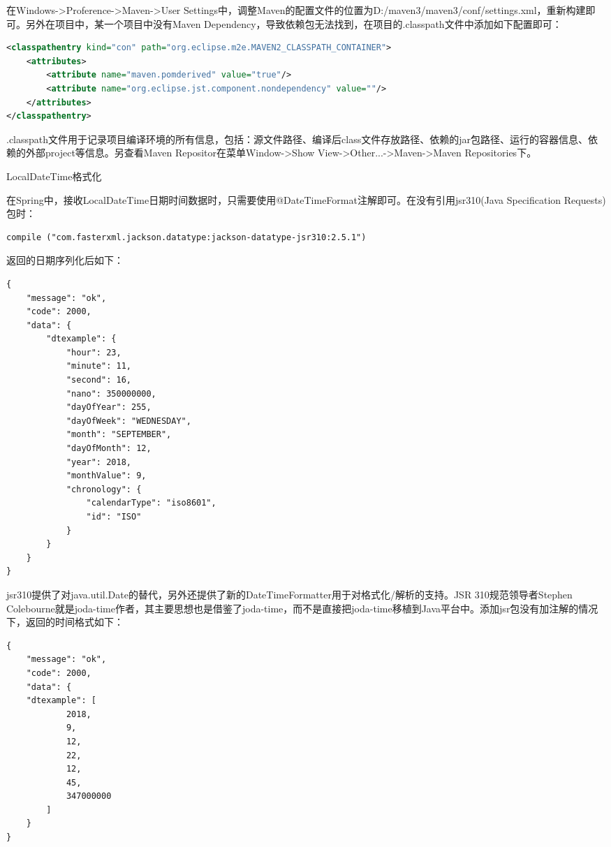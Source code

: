 \documentclass[8pt]{book}
\makeatletter
\numberwithin{dummy}{section}
\theoremstyle{ocrenumbox}
\theoremstyle{blacknumex}
\theoremstyle{blacknumbox}
\theoremstyle{ocrenum}
\renewcommand{\subsection}{\@startsection {subsection}{2}{\z@}
	{-3ex \@plus -0.1ex \@minus -.4ex}
	{0.5ex \@plus.2ex }
	{\normalfont\sffamily\bfseries}}
\makeatother
\begin{document}
在Windows->Proference->Maven->User Settings中，调整Maven的配置文件的位置为D:/maven3/maven3/conf/settings.xml，重新构建即可。另外在项目中，某一个项目中没有Maven Dependency，导致依赖包无法找到，在项目的.classpath文件中添加如下配置即可：

\begin{lstlisting}[language=XML]
<classpathentry kind="con" path="org.eclipse.m2e.MAVEN2_CLASSPATH_CONTAINER">
	<attributes>
		<attribute name="maven.pomderived" value="true"/>
		<attribute name="org.eclipse.jst.component.nondependency" value=""/>
	</attributes>
</classpathentry>
\end{lstlisting}

.classpath文件用于记录项目编译环境的所有信息，包括：源文件路径、编译后class文件存放路径、依赖的jar包路径、运行的容器信息、依赖的外部project等信息。另查看Maven Repositor在菜单Window->Show View->Other...->Maven->Maven Repositories下。

\subsection{LocalDateTime格式化}

在Spring中，接收LocalDateTime日期时间数据时，只需要使用@DateTimeFormat注解即可。在没有引用jsr310(Java Specification Requests)包时：

\begin{lstlisting}
compile ("com.fasterxml.jackson.datatype:jackson-datatype-jsr310:2.5.1")
\end{lstlisting}

返回的日期序列化后如下：
\begin{lstlisting}
{
	"message": "ok",
	"code": 2000,
	"data": {
		"dtexample": {
			"hour": 23,
			"minute": 11,
			"second": 16,
			"nano": 350000000,
			"dayOfYear": 255,
			"dayOfWeek": "WEDNESDAY",
			"month": "SEPTEMBER",
			"dayOfMonth": 12,
			"year": 2018,
			"monthValue": 9,
			"chronology": {
				"calendarType": "iso8601",
				"id": "ISO"
			}
		}
	}
}
\end{lstlisting}

jsr310提供了对java.util.Date的替代，另外还提供了新的DateTimeFormatter用于对格式化/解析的支持。JSR 310规范领导者Stephen Colebourne就是joda-time作者，其主要思想也是借鉴了joda-time，而不是直接把joda-time移植到Java平台中。添加jsr包没有加注解的情况下，返回的时间格式如下：

\begin{lstlisting}
{
	"message": "ok",
	"code": 2000,
	"data": {
	"dtexample": [
			2018,
			9,
			12,
			22,
			12,
			45,
			347000000
		]
	}
}

\end{lstlisting}
\end{document}
